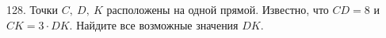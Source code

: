 128. Точки $C,\ D,\ K$ расположены на одной прямой. Известно, что $CD=8$ и $CK=3\cdot DK.$ Найдите все возможные значения $DK.$\\
